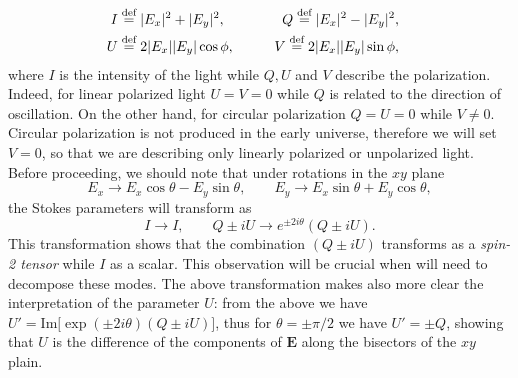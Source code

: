 \begin{align}\label{eq:stokes_parameters}
    I&\stackrel{\text{def}}{=} |E_x|^2+|E_y|^2,\qquad &Q\stackrel{\text{def}}{=} |E_x|^2-|E_y|^2,&&\nonumber\\ U&\stackrel{\text{def}}{=} 2|E_x||E_y|\cos\phi,\qquad &V\stackrel{\text{def}}{=} 2|E_x||E_y|\sin\phi,&&
\end{align}
where $I$ is the intensity of the light while $Q,U$ and $V$ describe the polarization. Indeed, for linear polarized light $U=V=0$ while $Q$ is related to the direction of oscillation. On the other hand, for circular polarization $Q=U=0$ while $V\neq0$.\\Circular polarization is not produced in the early universe, therefore we will set $V=0$, so that we are describing only linearly polarized or unpolarized light.\\
Before proceeding, we should note that under rotations in the $xy$ plane $$E_x\rightarrow E_x\cos\theta-E_y\sin\theta,\qquad E_y\rightarrow E_x\sin\theta+E_y\cos\theta,$$ the  Stokes parameters will transform as
$$I\rightarrow I,\qquad Q\pm iU\rightarrow e^{\pm 2i\theta}(Q\pm iU).$$
This transformation shows that the combination $(Q\pm iU)$ transforms as a \emph{spin-2 tensor} while $I$ as a scalar. This observation will be crucial when will need to decompose these modes. The above transformation makes also more clear the interpretation of the parameter $U$: from the above we have $U'=\text{Im}\big[\exp(\pm2i\theta)(Q\pm iU)\big]$, thus for $\theta= \pm\pi/2$ we have $U'=\pm Q$, showing that $U$ is the difference of the components of $\mathbf{E}$ along the bisectors of the $xy$ plain.
